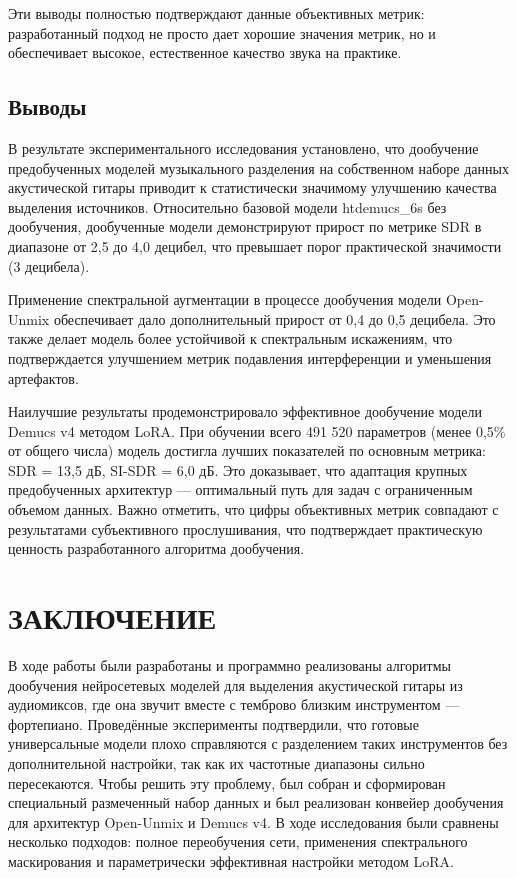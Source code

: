 \documentclass[14pt]{extarticle}
\begin{document}
Эти выводы полностью подтверждают данные объективных метрик: разработанный подход не просто дает хорошие значения метрик, 
но и обеспечивает высокое, естественное качество звука на практике.

\subsection{Выводы}

В результате экспериментального исследования установлено, что дообучение предобученных моделей музыкального разделения 
на собственном наборе данных акустической гитары приводит к статистически значимому улучшению качества выделения источников. 
Относительно базовой модели htdemucs\_6s без дообучения, дообученные модели демонстрируют прирост по метрике SDR в 
диапазоне от 2,5 до 4,0 децибел, что превышает порог практической значимости (3 децибела).

Применение спектральной аугментации в процессе дообучения модели Open-Unmix обеспечивает дало дополнительный прирост от 
0,4 до 0,5 децибела. Это также делает модель более устойчивой к спектральным искажениям, что подтверждается улучшением метрик 
подавления интерференции и уменьшения артефактов.

Наилучшие результаты продемонстрировало эффективное дообучение модели Demucs v4 методом LoRA. 
При обучении всего 491 520 параметров (менее 0,5\% от общего числа) модель достигла лучших показателей по 
основным метрика: SDR = 13,5 дБ, SI-SDR = 6,0 дБ. 
Это доказывает, что адаптация крупных предобученных архитектур --- оптимальный путь для задач с ограниченным объемом данных. 
Важно отметить, что цифры объективных метрик совпадают с результатами субъективного прослушивания, 
что подтверждает практическую ценность разработанного алгоритма дообучения.


\section*[ЗАКЛЮЧЕНИЕ]{ЗАКЛЮЧЕНИЕ}


В ходе работы были разработаны и программно реализованы алгоритмы дообучения нейросетевых моделей для 
выделения акустической гитары из аудиомиксов, где она звучит вместе с темброво близким инструментом --- фортепиано. 
Проведённые эксперименты подтвердили, что готовые универсальные модели плохо справляются с разделением таких инструментов 
без дополнительной настройки, так как их частотные диапазоны сильно пересекаются. 
Чтобы решить эту проблему, был собран и сформирован специальный размеченный набор данных и был реализован конвейер дообучения 
для архитектур Open-Unmix и Demucs v4. 
В ходе исследования были сравнены несколько подходов: полное переобучения сети, применения спектрального маскирования и 
параметрически эффективная настройки методом LoRA.
\end{document}
